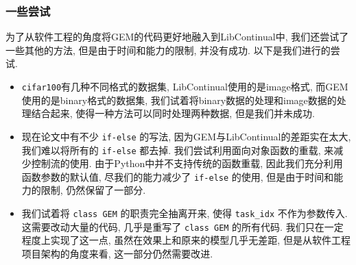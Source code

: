 \subsubsection{一些尝试}
为了从软件工程的角度将GEM的代码更好地融入到LibContinual中, 我们还尝试了一些其他的方法, 但是由于时间和能力的限制, 并没有成功. 以下是我们进行的尝试.
\begin{itemize}
    \item \lstinline{cifar100}有几种不同格式的数据集, LibContinual使用的是image格式, 而GEM使用的是binary格式的数据集, 我们试着将binary数据的处理和image数据的处理结合起来, 使得一种方法可以同时处理两种数据, 但是我们并未成功.
    \item 现在论文中有不少 \lstinline{if-else} 的写法, 因为GEM与LibContinual的差距实在太大, 我们难以将所有的 \lstinline{if-else} 都去掉. 我们尝试利用面向对象函数的重载, 来减少控制流的使用. 由于Python中并不支持传统的函数重载, 因此我们充分利用函数参数的默认值, 尽我们的能力减少了 \lstinline{if-else} 的使用, 但是由于时间和能力的限制, 仍然保留了一部分.
    \item 我们试着将 \lstinline{class GEM} 的职责完全抽离开来, 使得 \lstinline{task_idx} 不作为参数传入. 这需要改动大量的代码, 几乎是重写了 \lstinline{class GEM} 的所有代码. 我们只在一定程度上实现了这一点, 虽然在效果上和原来的模型几乎无差距, 但是从软件工程项目架构的角度来看, 这一部分仍然需要改进.
\end{itemize}
